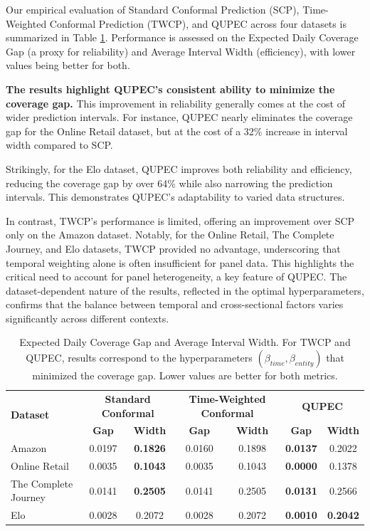 
Our empirical evaluation of Standard Conformal Prediction (SCP), Time-Weighted Conformal Prediction (TWCP), and QUPEC across four datasets is summarized in Table \ref{tab:results_comparison}. Performance is assessed on the Expected Daily Coverage Gap (a proxy for reliability) and Average Interval Width (efficiency), with lower values being better for both.

\textbf{The results highlight QUPEC's consistent ability to minimize the coverage gap.} This improvement in reliability generally comes at the cost of wider prediction intervals. For instance, QUPEC nearly eliminates the coverage gap for the Online Retail dataset, but at the cost of a 32\% increase in interval width compared to SCP.

Strikingly, for the Elo dataset, QUPEC improves both reliability and efficiency, reducing the coverage gap by over 64\% while also narrowing the prediction intervals. This demonstrates QUPEC's adaptability to varied data structures.

In contrast, TWCP's performance is limited, offering an improvement over SCP only on the Amazon dataset. Notably, for the Online Retail, The Complete Journey, and Elo datasets, TWCP provided no advantage, underscoring that temporal weighting alone is often insufficient for panel data. This highlights the critical need to account for panel heterogeneity, a key feature of QUPEC. The dataset-dependent nature of the results, reflected in the optimal hyperparameters, confirms that the balance between temporal and cross-sectional factors varies significantly across different contexts.

\begin{table}[t]
\centering
\caption{Expected Daily Coverage Gap and Average Interval Width. For TWCP and QUPEC, results correspond to the hyperparameters $(\beta_{time}, \beta_{entity})$ that minimized the coverage gap. Lower values are better for both metrics.}
\label{tab:results_comparison}
\begin{tabular}{|l|cc|cc|cc|}
\hline
\multirow{2}{*}{\textbf{Dataset}} & \multicolumn{2}{c|}{\textbf{Standard Conformal}} & \multicolumn{2}{c|}{\textbf{Time-Weighted Conformal}} & \multicolumn{2}{c|}{\textbf{QUPEC}} \\
\cline{2-7}
& \textbf{Gap} & \textbf{Width} & \textbf{Gap} & \textbf{Width} & \textbf{Gap} & \textbf{Width} \\
\hline
Amazon & 0.0197 & \textbf{0.1826} & 0.0160 & 0.1898 & \textbf{0.0137} & 0.2022 \\
Online Retail & 0.0035 & \textbf{0.1043} & 0.0035 & 0.1043 & \textbf{0.0000} & 0.1378 \\
The Complete Journey & 0.0141 & \textbf{0.2505} & 0.0141 & 0.2505 & \textbf{0.0131} & 0.2566 \\
Elo & 0.0028 & 0.2072 & 0.0028 & 0.2072 & \textbf{0.0010} & \textbf{0.2042} \\
\hline
\end{tabular}
\end{table}

